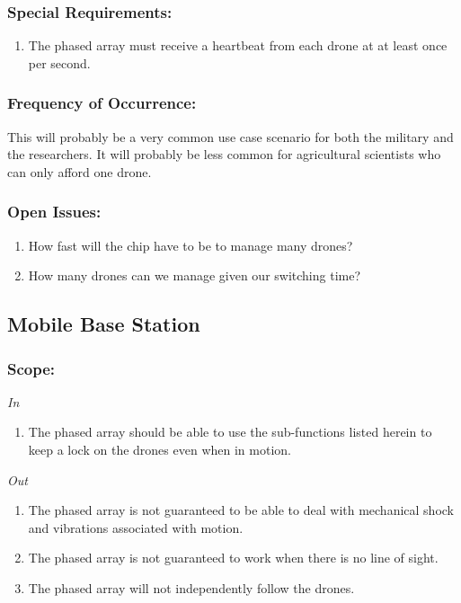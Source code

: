 \documentclass[ProductRequirements.tex]{subfiles}
\begin{document}
	\subsubsection*{Special Requirements:}
	\begin{enumerate}\itemsep1pt
		\item The phased array must receive a heartbeat from each drone at at least once per second.
	\end{enumerate}
	\subsubsection*{Frequency of Occurrence:}
	This will probably be a very common use case scenario for both the military and the researchers. It will probably be less common for agricultural scientists who can only afford one drone.
	\subsubsection*{Open Issues:}
	\begin{enumerate}
		\item How fast will the chip have to be to manage many drones?
		\item How many drones can we manage given our switching time?
	\end{enumerate}
	
	\subsection{Mobile Base Station}
	\subsubsection*{Scope:}
	\textit{In}
		\begin{enumerate}
			\item The phased array should be able to use the sub-functions listed herein to keep a lock on the drones even when in motion.
		\end{enumerate}
	\textit{Out}
		\begin{enumerate}
			\item The phased array is not guaranteed to be able to deal with mechanical shock and vibrations associated with motion.
			\item The phased array is not guaranteed to work when there is no line of sight.
			\item The phased array will not independently follow the drones.
		\end{enumerate}
\end{document}
